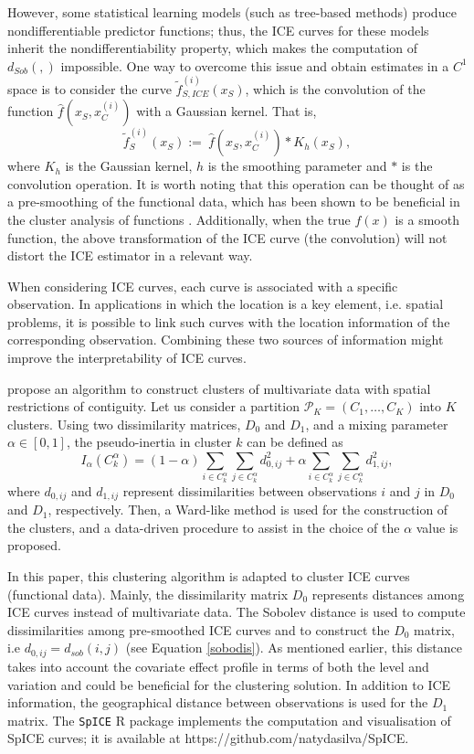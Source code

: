 \documentclass[smallextended,natbib]{svjour3}\usepackage[]{graphicx}\usepackage[]{xcolor}
\newcommand{\1}[1]{\mathbbm{1}_{#1}}
\begin{document}
However, some statistical learning models (such as tree-based methods) produce nondifferentiable predictor functions; thus, the ICE curves for these models inherit the nondifferentiability property, which makes the computation of $d_{Sob}(,)$ impossible. One way to overcome this issue and obtain estimates in a $C^1$ space is to consider the curve $\widetilde{f}_{S,ICE}^{(i)}(x_S)$, which is the convolution of the function  $\hat{f}(x_S, x_C^{(i)})$  with a Gaussian kernel. That is, 
\begin{equation}\label{}
 \widetilde{f}_{S}^{(i)}(x_S) := \ \hat{f}(x_S, x_C^{(i)}) \ast K_h(x_S),
\end{equation}
where $K_h$ is the Gaussian kernel, $h$ is the smoothing parameter and $\ast$ is the convolution operation. It is worth noting that this operation can be thought of as a pre-smoothing of the functional data, which has been shown to be beneficial in the cluster analysis of functions \citep{hitchcock2007effect}. Additionally, when the true $f(x)$ is a smooth function, the above transformation of the ICE curve (the convolution) will not distort the ICE estimator in a relevant way. 

When considering ICE curves, each curve is associated with a specific observation. In applications in which the location is a key element, i.e. spatial problems, it is possible to link such curves with the location information of the corresponding observation. Combining these two sources of information might improve the interpretability of ICE curves. 

\cite{chavent2018} propose an algorithm to construct clusters of multivariate data with spatial restrictions of contiguity. 
Let us consider a partition $\mathcal{P}_K = (C_1 ,\ldots , C_K )$ into $K$ clusters.  Using two dissimilarity matrices, $D_0$ and $D_1$, and a mixing parameter $\alpha \in [0,1]$, the pseudo-inertia in cluster $k$ can be defined as 
$$I_{\alpha} \left( C^{\alpha} _k \right)=  (1-\alpha) \sum_{i \in C^{\alpha}_k} \sum_{j \in C^{\alpha}_k} d^2_{0,ij}+\alpha \sum_{i \in C^{\alpha}_k} \sum_{j \in C^{\alpha}_k}d^2_{1,ij},$$
where $d_{0,ij}$ and $d_{1,ij}$ represent dissimilarities between observations $i$ and $j$ in $D_0$ and $D_1$, respectively. Then, a Ward-like method \citep{ward1963hierarchical} is used for the construction of the clusters, and a data-driven procedure to assist in the choice of the $\alpha$ value is proposed. 

In this paper, this clustering algorithm is adapted to cluster ICE curves (functional data). Mainly, the dissimilarity matrix $D_0$ represents distances among ICE curves instead of multivariate data. The Sobolev distance is used to compute dissimilarities among pre-smoothed ICE curves and to construct the $D_0$ matrix, i.e $d_{0,ij} = d_{sob}(i, j)$ (see Equation \eqref{sobodis}). As mentioned earlier, this distance takes into account the covariate effect profile in terms of both the level and variation and could be beneficial for the clustering solution. In addition to ICE information, the geographical distance between 
observations is used for the $D_1$ matrix. The \texttt{SpICE} R package implements the computation and visualisation of SpICE curves; it is available at  https://github.com/natydasilva/SpICE. 
\end{document}
